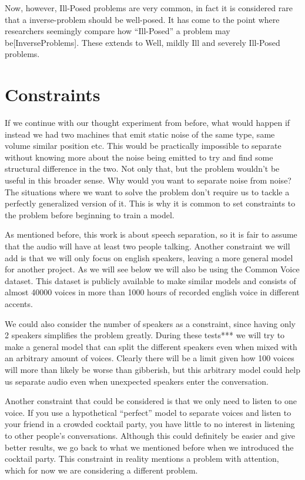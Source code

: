 \documentclass{book}
\begin{document}
    Now, however, Ill-Posed problems are very common, in fact it is considered rare that a inverse-problem should be well-posed. It has come to the point where researchers seemingly compare how “Ill-Posed” a problem may be[InverseProblems]. These extends to Well, mildly Ill and severely Ill-Posed problems.

\section{Constraints}

\qquad If we continue with our thought experiment from before, what would happen if instead we had two machines that emit static noise of the same type, same volume similar position etc. This would be practically impossible to separate without knowing more about the noise being emitted to try and find some structural difference in the two. Not only that, but the problem wouldn’t be useful in this broader sense. Why would you want to separate noise from noise? The situations where we want to solve the problem don’t require us to tackle a perfectly generalized version of it. This is why it is common to set constraints to the problem before beginning to train a model.
\par
As mentioned before, this work is about speech separation, so it is fair to assume that the audio will have at least two people talking. Another constraint we will add is that we will only focus on english speakers, leaving a more general model for another project. As we will see below we will also be using the Common Voice dataset. This dataset is publicly available to make similar models and consists of almost 40000 voices in more than 1000 hours of recorded english voice in different accents.
\par
We could also consider the number of speakers as a constraint, since having only 2 speakers simplifies the problem greatly. During these tests*** we will try to make a general model that can split the different speakers even when mixed with an arbitrary amount of voices. Clearly there will be a limit given how 100 voices will more than likely be worse than gibberish, but this arbitrary model could help us separate audio even when unexpected speakers enter the conversation.
\par
Another constraint that could be considered is that we only need to listen to one voice. If you use a hypothetical “perfect” model to separate voices and listen to your friend in a crowded cocktail party, you have little to no interest in listening to other people's conversations. Although this could definitely be easier and give better results, we go back to what we mentioned before when we introduced the cocktail party. This constraint in reality mentions a problem with attention, which for now we are considering a different problem.




\end{document}

